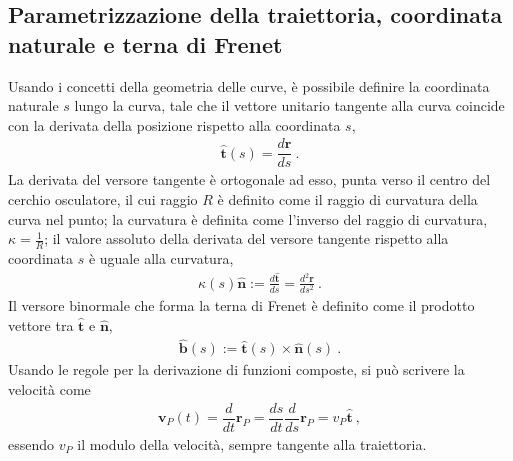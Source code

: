 \documentclass[letterpaper,10pt,english]{jupyterBook}
\begin{document}
\subsection{Parametrizzazione della traiettoria, coordinata naturale e terna di Frenet}
\label{\detokenize{ch/kinematics-point:parametrizzazione-della-traiettoria-coordinata-naturale-e-terna-di-frenet}}
\sphinxAtStartPar
Usando i concetti della geometria delle curve, è possibile definire la coordinata naturale \(s\) lungo la curva, tale che il vettore unitario tangente alla curva coincide con la derivata della posizione rispetto alla coordinata \(s\),
\begin{equation*}
\begin{split}\hat{\mathbf{t}}(s) = \dfrac{d \mathbf{r}}{d s} \ .\end{split}
\end{equation*}
\sphinxAtStartPar
La derivata del versore tangente è ortogonale ad esso, punta verso il centro del cerchio osculatore, il cui raggio \(R\) è definito come il raggio di curvatura della curva nel punto; la curvatura è definita come l’inverso del raggio di curvatura, \(\kappa = \frac{1}{R}\); il valore assoluto della derivata del versore tangente rispetto alla coordinata \(s\) è uguale alla curvatura,
\begin{equation*}
\begin{split}\kappa(s) \hat{\mathbf{n}} := \frac{d \hat{\mathbf{t}}}{ d s } =  \frac{d^2 \mathbf{r}}{ d s^2 } \ .\end{split}
\end{equation*}
\sphinxAtStartPar
Il versore binormale che forma la terna di Frenet è definito come il prodotto vettore tra \(\hat{\mathbf{t}}\) e \(\hat{\mathbf{n}}\),
\begin{equation*}
\begin{split}\hat{\mathbf{b}}(s) := \hat{\mathbf{t}}(s) \times \hat{\mathbf{n}}(s) \ .\end{split}
\end{equation*}
\sphinxAtStartPar
Usando le regole per la derivazione di funzioni composte, si può scrivere la velocità come
\begin{equation*}
\begin{split}\mathbf{v}_P(t) = \dfrac{d}{dt} \mathbf{r}_P = \dfrac{d s}{d t} \dfrac{d}{ds} \mathbf{r}_P = v_P \hat{\mathbf{t}} \ ,\end{split}
\end{equation*}
\sphinxAtStartPar
essendo \(v_P\) il modulo della velocità, sempre tangente alla traiettoria.
\end{document}
